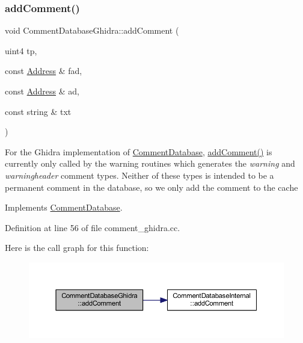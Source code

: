 \subsubsection{\texorpdfstring{addComment()}{addComment()}}
{\footnotesize\ttfamily void Comment\+Database\+Ghidra\+::add\+Comment (\begin{DoxyParamCaption}\item[{uint4}]{tp,  }\item[{const \mbox{\hyperlink{class_address}{Address}} \&}]{fad,  }\item[{const \mbox{\hyperlink{class_address}{Address}} \&}]{ad,  }\item[{const string \&}]{txt }\end{DoxyParamCaption})\hspace{0.3cm}{\ttfamily [virtual]}}

For the Ghidra implementation of \mbox{\hyperlink{class_comment_database}{Comment\+Database}}, \mbox{\hyperlink{class_comment_database_ghidra_ac4391823aa263f7c1b3488a825a534a9}{add\+Comment()}} is currently only called by the warning routines which generates the {\itshape warning} and {\itshape warningheader} comment types. Neither of these types is intended to be a permanent comment in the database, so we only add the comment to the cache 

Implements \mbox{\hyperlink{class_comment_database_a0e7bd4fd808c28610f4867af22589f0c}{Comment\+Database}}.



Definition at line 56 of file comment\+\_\+ghidra.\+cc.

Here is the call graph for this function\+:
\nopagebreak
\begin{figure}[H]
\begin{center}
\leavevmode
\includegraphics[width=350pt]{class_comment_database_ghidra_ac4391823aa263f7c1b3488a825a534a9_cgraph}
\end{center}
\end{figure}
\mbox{\label{class_comment_database_ghidra_a39ad32e0b6abb1ee32c96780ac9b446c}} 

